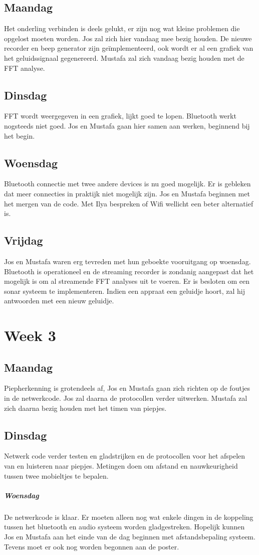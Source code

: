 \documentclass[12pt]{article}
\begin{document}
\subsection*{Maandag}
Het onderling verbinden is deels gelukt, er zijn nog wat kleine problemen die opgelost moeten worden. Jos zal zich hier vandaag mee bezig houden. De nieuwe recorder en beep generator zijn ge\"implementeerd, ook wordt er al een grafiek van het geluidssignaal gegenereerd. Mustafa zal zich vandaag bezig houden met de FFT analyse.
\subsection*{Dinsdag}
FFT wordt weergegeven in een grafiek, lijkt goed te lopen. Bluetooth werkt nogsteeds niet goed. Jos en Mustafa gaan hier samen aan werken, beginnend bij het begin.
\subsection*{Woensdag}
Bluetooth connectie met twee andere devices is nu goed mogelijk. Er is gebleken dat meer connecties in praktijk niet mogelijk zijn. Jos en Mustafa beginnen met het mergen van de code. Met Ilya bespreken of Wifi wellicht een beter alternatief is.
\subsection*{Vrijdag}
Jos en Mustafa waren erg tevreden met hun geboekte vooruitgang op woensdag. Bluetooth is operationeel en de streaming recorder is zondanig aangepast dat het mogelijk is om al streamende FFT analyses uit te voeren. Er is besloten om een sonar systeem te implementeren. Indien een appraat een geluidje hoort, zal hij antwoorden met een nieuw geluidje. 

\section*{Week 3}
\subsection*{Maandag}
Piepherkenning is grotendeels af, Jos en Mustafa gaan zich richten op de foutjes in de netwerkcode. Jos zal daarna de protocollen verder uitwerken. Mustafa zal zich daarna bezig houden met het timen van piepjes.
\subsection*{Dinsdag}
Netwerk code verder testen en gladstrijken en de protocollen voor het afspelen van en luisteren naar piepjes. Metingen doen om afstand en nauwkeurigheid tussen twee mobieltjes te bepalen.
\subparagraph*{Woensdag}
De netwerkcode is klaar. Er moeten alleen nog wat enkele dingen in de koppeling tussen het bluetooth en audio systeem worden gladgestreken. Hopelijk kunnen Jos en Mustafa aan het einde van de dag beginnen met afstandsbepaling systeem. Tevens moet er ook nog worden begonnen aan de poster.
\end{document}

